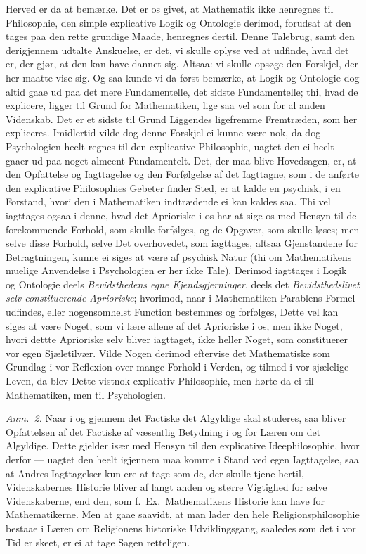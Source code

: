 \documentclass[12pt,a4paper]{book}
\newcommand{\apage}[1]{\marginnote{\footnotesize\textit{[#1]}}}
\begin{document}
{\small Herved er da at bemærke. Det er os givet, at Mathematik ikke henregnes til
Philosophie, den simple explicative Logik og Ontologie derimod, forudsat at den
tages paa den rette grundige Maade, henregnes dertil. Denne Talebrug, samt den
derigjennem udtalte Anskuelse, er det, vi skulle oplyse ved at udfinde, hvad det er,
der gjør, at den kan have dannet sig. Altsaa: vi skulle opsøge den Forskjel, der her
maatte vise sig. Og saa kunde vi da først bemærke, at Logik og Ontologie dog altid
gaae ud paa det mere Fundamentelle, det sidste Fundamentelle; thi, hvad de
explicere, ligger til Grund for Mathematiken, lige saa vel som for al anden
Videnskab. Det er et sidste til Grund Liggendes ligefremme Fremtræden, som her
expliceres. Imidlertid vilde dog denne Forskjel ei kunne være nok, da dog
Psychologien heelt regnes til den explicative Philosophie, uagtet den ei heelt gaaer
ud paa noget almeent Fundamentelt. Det, der maa blive Hovedsagen, er, at den
Opfattelse og Iagttagelse og den Forfølgelse af det Iagttagne, som i de anførte den
explicative Philosophies Gebeter finder Sted, er at kalde en psychisk, i en
Forstand, hvori den i Mathematiken indtrædende ei kan kaldes saa. Thi vel iagttages
ogsaa i denne, hvad det Aprioriske i os har at sige os med Hensyn til de
forekommende Forhold, som skulle forfølges, og de Opgaver, som skulle løses; men
selve disse Forhold, selve Det overhovedet, som iagttages, altsaa Gjenstandene for
Betragtningen, kunne ei siges at være af psychisk Natur (thi om Mathematikens
muelige Anvendelse i Psychologien er her ikke Tale). Derimod iagttages i Logik og
Ontologie deels \emph{Bevidsthedens egne Kjendsgjerninger}, deels det
\emph{Bevidsthedslivet selv constituerende Aprioriske}; hvorimod, naar i
Mathematiken Parablens Formel udfindes, eller nogensomhelst Function bestemmes og
forfølges, Dette vel kan siges at være Noget, som vi lære allene af det Aprioriske i
os, men ikke Noget, hvori dettte Aprioriske selv bliver iagttaget, ikke heller
Noget, som constituerer vor egen Sjæletilvær. Vilde Nogen derimod eftervise det
Mathematiske som Grundlag i vor Reflexion over mange Forhold i Verden, og tilmed i
vor sjælelige Leven, da blev Dette vistnok explicativ Philosophie, men hørte da ei
til Mathematiken, men til Psychologien.\par}
  \apage{39}
{\small

\emph{Anm.~2.} Naar i og gjennem det Factiske det Algyldige skal studeres,
saa bliver Opfattelsen af det Factiske af væsentlig Betydning i og for Læren om det
Algyldige. Dette gjelder især med Hensyn til den explicative Ideephilosophie, hvor
derfor --- uagtet den heelt igjennem maa komme i Stand ved egen Iagttagelse, saa at
Andres Iagttagelser kun ere at tage som de, der skulle tjene hertil, ---
Videnskabernes Historie bliver af langt anden og større Vigtighed for selve
Videnskaberne, end den, som f.\ Ex.\ Mathematikens Historie kan have for
Mathematikerne. Men at gaae saavidt, at man lader den hele Religionsphilosophie
bestaae i Læren om Religionens historiske Udviklingsgang, saaledes som det i vor Tid
er skeet, er ei at tage Sagen retteligen.\par}
\end{document}
